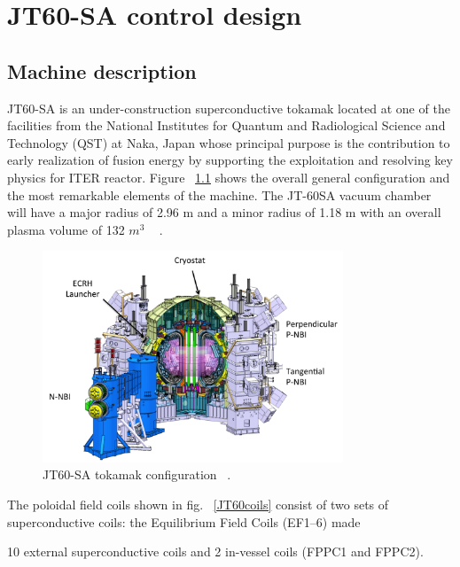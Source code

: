\chapter{JT60-SA control design}

\section{Machine description}

JT60-SA is an under-construction superconductive tokamak located at one of the facilities from the National Institutes for Quantum and Radiological Science and Technology (QST)  at  Naka, Japan whose principal purpose is  the contribution to early realization of fusion energy by supporting the exploitation and resolving key physics for ITER reactor. Figure ~\ref{JT60schm} shows the overall general configuration and the most remarkable elements of the machine. The JT-60SA  vacuum chamber will have a major radius of 2.96 m and a minor radius of 1.18 m with an overall plasma volume of 132 $m^3$ ~\cite{Spears2014} .
\smallskip
\begin{figure}
	\centering
	\includegraphics[width=0.80\textwidth]{Chp3/JT60SA.png}
	
	\caption{\label{JT60schm}JT60-SA tokamak configuration ~\cite{JT60SA:ResearchPlan}.}
\end{figure}



The poloidal field coils shown in fig. ~\ref{JT60coils} consist of two sets of superconductive coils: the Equilibrium Field Coils (EF1–6) made

 10 external superconductive coils and 2 in-vessel coils (FPPC1 and FPPC2). 


